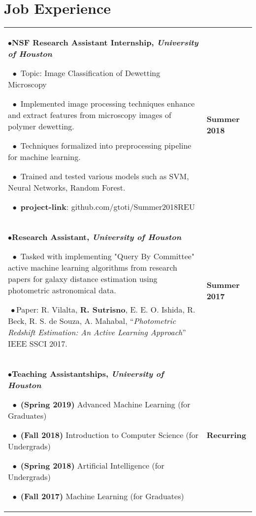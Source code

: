 \documentclass{article}
\begin{document}
\section{Job Experience}
\begin{flushleft}
\begin{tabular}{p{15.5cm} p{2.5cm}}

{$\bullet$}\textbf{NSF Research Assistant Internship, \textit{University of Houston}}

    $\ \ \bullet$ Topic: Image Classification of Dewetting Microscopy

    $\ \ \bullet$ Implemented image processing techniques enhance and extract features
    from microscopy images of polymer dewetting. 

    $\ \ \bullet$ Techniques formalized into preprocessing pipeline for machine learning.

    $\ \ \bullet$ Trained and tested various models such as SVM, Neural Networks, Random Forest.

    $\ \ \bullet$ \textbf{project-link}: github.com/gtoti/Summer2018REU

    & \textbf{Summer 2018}
    \\[1.00cm]

{$\bullet$}\textbf{Research Assistant, \textit{University of Houston}}

    $\ \ \bullet$ Tasked with implementing "Query By Committee" active machine learning algorithms from research papers for galaxy distance estimation using photometric astronomical data.

{$\ \bullet$}Paper: R. Vilalta, \textbf{R. Sutrisno}, E. E. O. Ishida, R. Beck, R. S. de Souza, A. Mahabal,
``\textit{Photometric Redshift Estimation: An Active Learning Approach}'' IEEE SSCI 2017.


    & \textbf{Summer 2017} \\

{$\bullet$}\textbf{Teaching Assistantships, \textit{University of Houston}}

    $\ \ \bullet$ \textbf{(Spring 2019)} Advanced Machine Learning (for Graduates) 

    $\ \ \bullet$ \textbf{(Fall 2018)}  Introduction to Computer Science (for Undergrads) 

    $\ \ \bullet$ \textbf{(Spring 2018)} Artificial Intelligence (for Undergrads) 

    $\ \ \bullet$ \textbf{(Fall 2017)}  Machine Learning (for Graduates) 

    &
    \textbf{Recurring} \\[1.00cm]

\end{tabular}
\end{flushleft}
\end{document}
